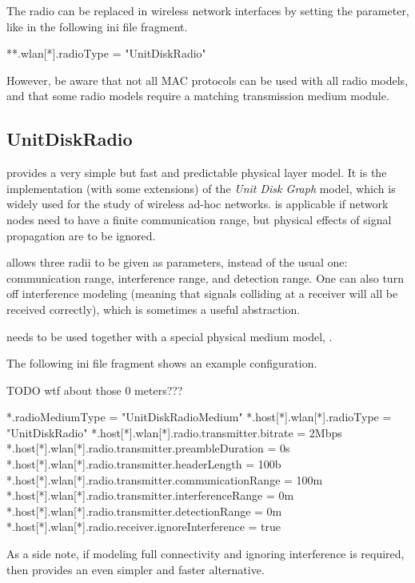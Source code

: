 The radio can be replaced in wireless network interfaces by setting the
 parameter, like in the following ini file fragment.
  
\begin{inifile}
**.wlan[*].radioType = "UnitDiskRadio"
\end{inifile}

However, be aware that not all MAC protocols can be used with all radio models,
and that some radio models require a matching transmission medium module. 

\subsection{UnitDiskRadio}

 provides a very simple but fast and predictable 
physical layer model. It is the implementation (with some extensions)
of the \textit{Unit Disk Graph} model, which is widely used 
for the study of wireless ad-hoc networks.
 is applicable if network nodes need 
to have a finite communication range, but physical effects 
of signal propagation are to be ignored.

 allows three radii to be given as parameters,
instead of the usual one: communication range, interference range, and
detection range. One can also turn off interference modeling 
(meaning that signals colliding at a receiver will all be received 
correctly), which is sometimes a useful abstraction.

 needs to be used together with a special physical
medium model, .

The following ini file fragment shows an example configuration.

TODO wtf about those 0 meters???

\begin{inifile}
*.radioMediumType = "UnitDiskRadioMedium"
*.host[*].wlan[*].radioType = "UnitDiskRadio"
*.host[*].wlan[*].radio.transmitter.bitrate = 2Mbps
*.host[*].wlan[*].radio.transmitter.preambleDuration = 0s
*.host[*].wlan[*].radio.transmitter.headerLength = 100b
*.host[*].wlan[*].radio.transmitter.communicationRange = 100m
*.host[*].wlan[*].radio.transmitter.interferenceRange = 0m    
*.host[*].wlan[*].radio.transmitter.detectionRange = 0m
*.host[*].wlan[*].radio.receiver.ignoreInterference = true
\end{inifile}

As a side note, if modeling full connectivity and ignoring 
interference is required, then  
provides an even simpler and faster alternative.

